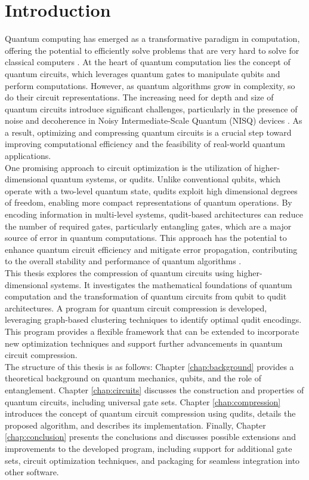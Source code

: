 \chapter{Introduction} \label{chap:introduction}
Quantum computing has emerged as a transformative paradigm in computation, offering the potential to efficiently solve problems that are very hard to solve for classical computers \cite{gill2024quantum}. At the heart of quantum computation lies the concept of quantum circuits, which leverages quantum gates to manipulate qubits and perform computations. However, as quantum algorithms grow in complexity, so do their circuit representations. The increasing need for depth and size of quantum circuits introduce significant challenges, particularly in the presence of noise and decoherence in Noisy Intermediate-Scale Quantum (NISQ) devices \cite{Preskill_2018}. As a result, optimizing and compressing quantum circuits is a crucial step toward improving computational efficiency and the feasibility of real-world quantum applications.
\\[12pt]
One promising approach to circuit optimization is the utilization of higher-dimensional quantum systems, or qudits. Unlike conventional qubits, which operate with a two-level quantum state, qudits exploit high dimensional degrees of freedom, enabling more compact representations of quantum operations. By encoding information in multi-level systems, qudit-based architectures can reduce the number of required gates, particularly entangling gates, which are a major source of error in quantum computations. This approach has the potential to enhance quantum circuit efficiency and mitigate error propagation, contributing to the overall stability and performance of quantum algorithms \cite{gao2023role}.
\\[12pt]
This thesis explores the compression of quantum circuits using higher-dimensional systems. It investigates the mathematical foundations of quantum computation and the transformation of quantum circuits from qubit to qudit architectures. A program for quantum circuit compression is developed, leveraging graph-based clustering techniques to identify optimal qudit encodings. This program provides a flexible framework that can be extended to incorporate new optimization techniques and support further advancements in quantum circuit compression.
\\[12pt]
The structure of this thesis is as follows: Chapter \ref{chap:background} provides a theoretical background on quantum mechanics, qubits, and the role of entanglement. Chapter \ref{chap:circuits} discusses the construction and properties of quantum circuits, including universal gate sets. Chapter \ref{chap:compression} introduces the concept of quantum circuit compression using qudits, details the proposed algorithm, and describes its implementation. Finally, Chapter \ref{chap:conclusion} presents the conclusions and discusses possible extensions and improvements to the developed program, including support for additional gate sets, circuit optimization techniques, and packaging for seamless integration into other software.